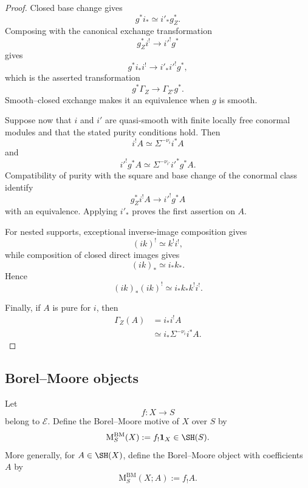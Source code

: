 \begin{proof}
Closed base change gives
\[
    g^*i_*
    \simeq
    i'_*g_Z^*.
\]
Composing with the canonical exchange transformation
\[
    g_Z^*i^!
    \longrightarrow
    i'^!g^*
\]
gives
\[
    g^*i_*i^!
    \longrightarrow
    i'_*i'^!g^*,
\]
which is the asserted transformation
\[
    g^*\Gamma_Z
    \longrightarrow
    \Gamma_{Z'}g^*.
\]
Smooth--closed exchange makes it an equivalence when \(g\) is smooth.

Suppose now that \(i\) and \(i'\) are quasi-smooth with finite locally free
conormal modules and that the stated purity conditions hold.  Then
\[
    i^!A
    \simeq
    \Sigma^{-\nu_i}i^*A
\]
and
\[
    i'^!g^*A
    \simeq
    \Sigma^{-\nu_{i'}}i'^*g^*A.
\]
Compatibility of purity with the square and base change of the conormal
class identify
\[
    g_Z^*i^!A
    \longrightarrow
    i'^!g^*A
\]
with an equivalence.  Applying \(i'_*\) proves the first assertion on \(A\).

For nested supports, exceptional inverse-image composition gives
\[
    (ik)^!
    \simeq
    k^!i^!,
\]
while composition of closed direct images gives
\[
    (ik)_*
    \simeq
    i_*k_*.
\]
Hence
\[
    (ik)_*(ik)^!
    \simeq
    i_*k_*k^!i^!.
\]

Finally, if \(A\) is pure for \(i\), then
\[
\begin{aligned}
    \Gamma_Z(A)
    &=
    i_*i^!A \\
    &\simeq
    i_*\Sigma^{-\nu_i}i^*A.
\end{aligned}
\]
\end{proof}

\subsection{Borel--Moore objects}

\begin{definition}
\label{def:borel-moore-motive}
Let
\[
    f:X\longrightarrow S
\]
belong to \(\mathcal E\).  Define the Borel--Moore motive of \(X\) over
\(S\) by
\[
    \mathrm M^{\mathrm{BM}}_S(X)
    :=
    f_!\mathbf1_X
    \in
    \SH(S).
\]
More generally, for \(A\in\SH(X)\), define the Borel--Moore object with
coefficients \(A\) by
\[
    \mathrm M^{\mathrm{BM}}_S(X;A)
    :=
    f_!A.
\]
\end{definition}


